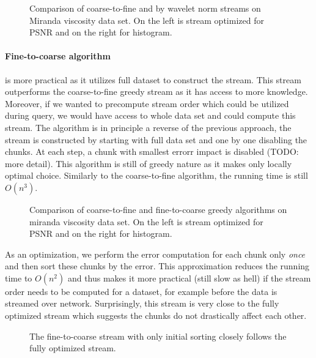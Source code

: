 \begin{figure}
        \centering
        \caption{Comparison of coarse-to-fine and by wavelet norm streams on Miranda viscosity data set.
                 On the left is stream optimized for PSNR and on the right for histogram.}
\end{figure}

\paragraph*{Fine-to-coarse algorithm} is more practical as it utilizes full dataset to construct the stream.
This stream outperforms the coarse-to-fine greedy stream as it has access to more knowledge. Moreover,
if we wanted to precompute stream order which could be utilized during query, we would have access to whole
data set and could compute this stream. The algorithm is in principle a reverse of the previous approach, the
stream is constructed by starting with full data set and one by one disabling the chunks. At each step, a chunk
with smallest errorr impact is disabled (TODO: more detail). This algorithm is still of greedy nature as it
makes only locally optimal choice. Similarly to the coarse-to-fine algorithm, the running time is still $O(n^3)$.

\begin{figure}
        \centering
        \caption{Comparison of coarse-to-fine and fine-to-coarse greedy algorithms on miranda viscosity data set.
                 On the left is stream optimized for PSNR and on the right for histogram.}
\end{figure}


As an optimization, we perform the error computation for each chunk only {\em once} and then sort these chunks
by the error. This approximation reduces the running time to $O(n^2)$ and thus makes it more practical (still
slow as hell) if
the stream order needs to be computed for a dataset, for example before the data is streamed over network.
Surprisingly, this stream is very close to the fully optimized stream which suggests the chunks do not drastically
affect each other.



\begin{figure}
        \centering
        \caption{The fine-to-coarse stream with only initial sorting closely follows the fully optimized stream.}
\end{figure}
